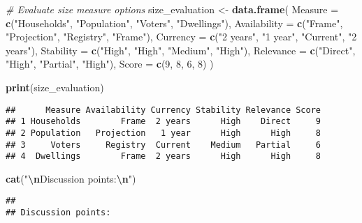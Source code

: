 \documentclass[
]{article}
\newenvironment{Shaded}{\begin{snugshade}}{\end{snugshade}}
\newcommand{\AttributeTok}[1]{\textcolor[rgb]{0.13,0.29,0.53}{#1}}
\newcommand{\CommentTok}[1]{\textcolor[rgb]{0.56,0.35,0.01}{\textit{#1}}}
\newcommand{\DecValTok}[1]{\textcolor[rgb]{0.00,0.00,0.81}{#1}}
\newcommand{\FunctionTok}[1]{\textcolor[rgb]{0.13,0.29,0.53}{\textbf{#1}}}
\newcommand{\NormalTok}[1]{#1}
\newcommand{\OtherTok}[1]{\textcolor[rgb]{0.56,0.35,0.01}{#1}}
\newcommand{\SpecialCharTok}[1]{\textcolor[rgb]{0.81,0.36,0.00}{\textbf{#1}}}
\newcommand{\StringTok}[1]{\textcolor[rgb]{0.31,0.60,0.02}{#1}}
\begin{document}
\begin{Shaded}
\begin{Highlighting}[]
\CommentTok{\# Evaluate size measure options}
\NormalTok{size\_evaluation }\OtherTok{\textless{}{-}} \FunctionTok{data.frame}\NormalTok{(}
  \AttributeTok{Measure =} \FunctionTok{c}\NormalTok{(}\StringTok{"Households"}\NormalTok{, }\StringTok{"Population"}\NormalTok{, }\StringTok{"Voters"}\NormalTok{, }\StringTok{"Dwellings"}\NormalTok{),}
  \AttributeTok{Availability =} \FunctionTok{c}\NormalTok{(}\StringTok{"Frame"}\NormalTok{, }\StringTok{"Projection"}\NormalTok{, }\StringTok{"Registry"}\NormalTok{, }\StringTok{"Frame"}\NormalTok{),}
  \AttributeTok{Currency =} \FunctionTok{c}\NormalTok{(}\StringTok{"2 years"}\NormalTok{, }\StringTok{"1 year"}\NormalTok{, }\StringTok{"Current"}\NormalTok{, }\StringTok{"2 years"}\NormalTok{),}
  \AttributeTok{Stability =} \FunctionTok{c}\NormalTok{(}\StringTok{"High"}\NormalTok{, }\StringTok{"High"}\NormalTok{, }\StringTok{"Medium"}\NormalTok{, }\StringTok{"High"}\NormalTok{),}
  \AttributeTok{Relevance =} \FunctionTok{c}\NormalTok{(}\StringTok{"Direct"}\NormalTok{, }\StringTok{"High"}\NormalTok{, }\StringTok{"Partial"}\NormalTok{, }\StringTok{"High"}\NormalTok{),}
  \AttributeTok{Score =} \FunctionTok{c}\NormalTok{(}\DecValTok{9}\NormalTok{, }\DecValTok{8}\NormalTok{, }\DecValTok{6}\NormalTok{, }\DecValTok{8}\NormalTok{)}
\NormalTok{)}

\FunctionTok{print}\NormalTok{(size\_evaluation)}
\end{Highlighting}
\end{Shaded}

\begin{verbatim}
##      Measure Availability Currency Stability Relevance Score
## 1 Households        Frame  2 years      High    Direct     9
## 2 Population   Projection   1 year      High      High     8
## 3     Voters     Registry  Current    Medium   Partial     6
## 4  Dwellings        Frame  2 years      High      High     8
\end{verbatim}

\begin{Shaded}
\begin{Highlighting}[]
\FunctionTok{cat}\NormalTok{(}\StringTok{"}\SpecialCharTok{\textbackslash{}n}\StringTok{Discussion points:}\SpecialCharTok{\textbackslash{}n}\StringTok{"}\NormalTok{)}
\end{Highlighting}
\end{Shaded}

\begin{verbatim}
## 
## Discussion points:
\end{verbatim}
\end{document}
